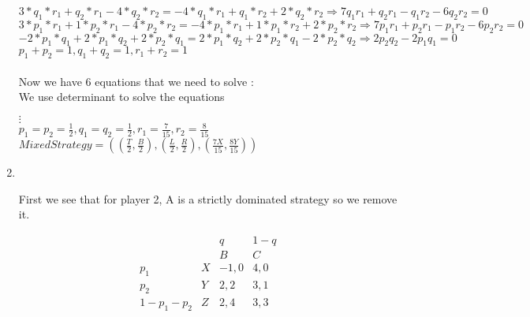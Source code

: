 \begin{enumerate}
\begin{latin}
\begin{center}
        \end{center}
        $3 * q_1*r_1 + q_2 * r_1 - 4 * q_2 * r_2 = -4 * q_1 * r_1 + q_1 * r_2 + 2 * q_2 * r_2 \Rightarrow 7q_1 r_1 + q_2 r_1 - q_1 r_2 - 6q_2 r_2 = 0$ \\  
        $3 * p_1 * r_1 + 1 * p_2 * r_1 - 4 * p_2 * r_2 = -4 * p_1 * r_1 + 1 * p_1 * r_2 + 2 * p_2 * r_2 \Rightarrow 7p_1 r_1 + p_2 r_1 - p_1 r_2 - 6p_2 r_2 = 0$ \\  
        $-2 * p_1 * q_1 + 2 * p_1 * q_2 + 2 * p_2 * q_1=  2 * p_1 * q_2 + 2 * p_2 * q_1  -2 * p_2 * q_2 \Rightarrow 2p_2 q_2 - 2p_1 q_1 = 0$ \\  
        $p_1 + p_2 = 1, q_1 + q_2 = 1 , r_1 + r_2 = 1$\\ \\ 
        Now we have 6 equations that we need to solve : \\ 
        We use determinant to solve the equations \\
        \begin{center}
            $\vdots$ \\
            \vspace{3mm}
            $ p_1 = p_2 = \frac{1}{2},q_1 = q_2 = \frac{1}{2},r_1 = \frac{7}{15}, r_2 = \frac{8}{15}$ \\ 
            \vspace{3mm}
            $Mixed Strategy = ((\frac{T}{2},\frac{B}{2}),(\frac{L}{2},\frac{R}{2}),(\frac{7X}{15},\frac{8Y}{15}))$
        \end{center}
    \end{latin}
    \pagebreak
    \item \phantom{text}\\
    \begin{latin}
        First we see that for player 2, A is a strictly dominated strategy so we remove it.
        \begin{center}
\begin{equation*}
            \begin{matrix}
                  &  & q & 1-q \\
                  &  & B & C \\
                 p_1 & X & -1,0 & 4,0 \\
                 p_2 & Y & 2,2 & 3,1\\
                 1-p_1-p_2 & Z & 2,4 & 3,3
                \end{matrix}
            \end{equation*}
       \end{center}

\end{latin}
\end{enumerate}
